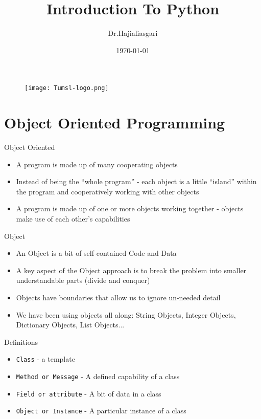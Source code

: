 \documentclass[serif, aspectratio=169]{beamer}
\author{Dr.Hajialiasgari}
\title{Introduction To Python}
\institute{
    Tehran University \\
    Of\\
    Medical Science
}
\date{\small \today}
\begin{document}
\begin{frame}
    \titlepage
    \vspace*{-0.6cm}
    \begin{figure}[htpb]
        \begin{center}
            \texttt{[image: Tumsl-logo.png]}
        \end{center}
    \end{figure}
\end{frame}

\begin{frame}    
\tableofcontents[sectionstyle=show, subsectionstyle=show/shaded/hide, subsubsectionstyle=show/shaded/hide]
\end{frame}

\section{Object Oriented Programming}

\begin{frame}{Object Oriented}
    \begin{itemize}
        \item A program is made up of many cooperating objects
        \item Instead of being the “whole program” - each object is a little “island” within the program and cooperatively working with other objects
        \item A program is made up of one or more objects working together - objects make use of each other’s capabilities
    \end{itemize}
\end{frame}


\begin{frame}{Object}
	\begin{itemize}
		\item An Object is a bit of self-contained Code and Data
		\item A key aspect of the Object approach is to break the problem into smaller understandable parts (divide and conquer)
		\item Objects have boundaries that allow us to ignore un-needed detail
		\item We have been using objects all along: String Objects, Integer Objects, Dictionary Objects, List Objects...
	\end{itemize}
\end{frame}


\begin{frame}{Definitions}
	\begin{itemize}
		\item \texttt{\color{red}Class} - a template
		\item \texttt{\color{red}Method or Message} - A defined capability of a class 
		\item \texttt{\color{red}Field or attribute} - A bit of data in a class
	    \item \texttt{\color{red}Object or Instance} - A particular instance of a class 
	\end{itemize}
\end{frame}
\end{document}
